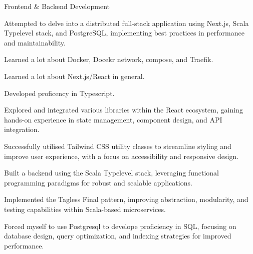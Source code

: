 
\begin{cventries}

  \cventry
    {Frontend \& Backend Development} %
    {} %
    {} %
    {} %
    {
      \begin{cvitems} %
        \item {Attempted to delve into a distributed full-stack application using Next.js, Scala Typelevel stack, and PostgreSQL, implementing best practices in performance and maintainability.}
        \item {Learned a lot about Docker, Docekr network, compose, and Traefik.}
        \item {Learned a lot about Next.js/React in general.}
        \item {Developed proficency in Typescript.}
        \item {Explored and integrated various libraries within the React ecosystem, gaining hands-on experience in state management, component design, and API integration.}
        \item {Successfully utilised Tailwind CSS utility classes to streamline styling and improve user experience, with a focus on accessibility and responsive design.}
        \item {Built a backend using the Scala Typelevel stack, leveraging functional programming paradigms for robust and scalable applications.}
        \item {Implemented the Tagless Final pattern, improving abstraction, modularity, and testing capabilities within Scala-based microservices.}
        \item {Forced myself to use Postgresql to develope proficiency in SQL, focusing on database design, query optimization, and indexing strategies for improved performance.}
      \end{cvitems}
    }


\end{cventries}
